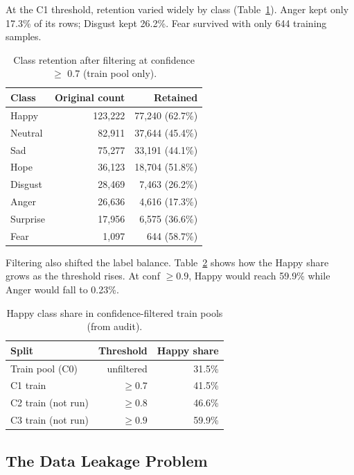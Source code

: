 \documentclass[11pt,a4paper]{article}
\begin{document}
At the C1 threshold, retention varied widely by class (Table~\ref{tab:retention}). Anger kept only 17.3\% of its rows; Disgust kept 26.2\%. Fear survived with only 644 training samples.

\begin{table}[H]
\centering
\caption{Class retention after filtering at confidence $\geq$ 0.7 (train pool only).}
\label{tab:retention}
\begin{tabular}{@{}lrr@{}}
\toprule
Class & Original count & Retained \\
\midrule
Happy    & 123,222 & 77,240 (62.7\%) \\
Neutral  &  82,911 & 37,644 (45.4\%) \\
Sad      &  75,277 & 33,191 (44.1\%) \\
Hope     &  36,123 & 18,704 (51.8\%) \\
Disgust  &  28,469 &  7,463 (26.2\%) \\
Anger    &  26,636 &  4,616 (17.3\%) \\
Surprise &  17,956 &  6,575 (36.6\%) \\
Fear     &   1,097 &    644 (58.7\%) \\
\bottomrule
\end{tabular}
\end{table}

Filtering also shifted the label balance. Table~\ref{tab:label_skew} shows how the Happy share grows as the threshold rises. At conf $\geq 0.9$, Happy would reach 59.9\% while Anger would fall to 0.23\%.

\begin{table}[H]
\centering
\caption{Happy class share in confidence-filtered train pools (from audit).}
\label{tab:label_skew}
\begin{tabular}{@{}lrr@{}}
\toprule
Split & Threshold & Happy share \\
\midrule
Train pool (C0) & unfiltered & 31.5\% \\
C1 train          & $\geq 0.7$ & 41.5\% \\
C2 train (not run) & $\geq 0.8$ & 46.6\% \\
C3 train (not run) & $\geq 0.9$ & 59.9\% \\
\bottomrule
\end{tabular}
\end{table}

\subsection{The Data Leakage Problem}
\end{document}
